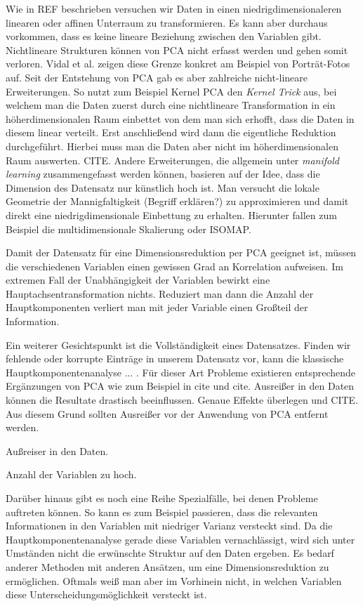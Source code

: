 Wie in REF beschrieben versuchen wir Daten in einen niedrigdimensionaleren linearen oder affinen Unterraum zu transformieren. Es kann aber durchaus vorkommen, dass es keine lineare Beziehung zwischen den Variablen gibt. Nichtlineare Strukturen können von PCA nicht erfasst werden und gehen somit verloren. \cite{vidal} Vidal et al. zeigen diese Grenze konkret am Beispiel von Porträt-Fotos auf. Seit der Entstehung von PCA gab es aber zahlreiche nicht-lineare Erweiterungen. So nutzt zum Beispiel Kernel PCA den \textit{Kernel Trick} aus, bei welchem man die Daten zuerst durch eine nichtlineare Transformation in ein höherdimensionalen Raum einbettet von dem man sich erhofft, dass die Daten in diesem linear verteilt. Erst anschließend wird dann die eigentliche Reduktion durchgeführt. Hierbei muss man die Daten aber nicht im höherdimensionalen Raum auswerten. CITE. Andere Erweiterungen, die allgemein unter \textit{manifold learning} zusammengefasst werden können, basieren auf der Idee, dass die Dimension des Datensatz nur künstlich hoch ist. Man versucht die lokale Geometrie der Mannigfaltigkeit (Begriff erklären?) zu approximieren und damit direkt eine niedrigdimensionale Einbettung zu erhalten. Hierunter fallen zum Beispiel die multidimensionale Skalierung oder ISOMAP.

Damit der Datensatz für eine Dimensionsreduktion per PCA geeignet ist, müssen die verschiedenen Variablen einen gewissen Grad an Korrelation aufweisen. Im extremen Fall der Unabhängigkeit der Variablen bewirkt eine Hauptachsentransformation nichts. Reduziert man dann die Anzahl der Hauptkomponenten verliert man mit jeder Variable einen Großteil der Information.

Ein weiterer Gesichtspunkt ist die Vollständigkeit eines Datensatzes. Finden wir fehlende oder korrupte Einträge in unserem Datensatz vor, kann die klassische Hauptkomponentenanalyse ... . Für dieser Art Probleme existieren entsprechende Ergänzungen von PCA wie zum Beispiel in cite und cite. Ausreißer in den Daten können die Resultate drastisch beeinflussen. Genaue Effekte überlegen und CITE. Aus diesem Grund sollten Ausreißer vor der Anwendung von PCA entfernt werden.

Außreiser in den Daten.

Anzahl der Variablen zu hoch.

Darüber hinaus gibt es noch eine Reihe Spezialfälle, bei denen Probleme auftreten können. So kann es zum Beispiel passieren, dass die relevanten Informationen in den Variablen mit niedriger Varianz versteckt sind. Da die Hauptkomponentenanalyse gerade diese Variablen vernachlässigt, wird sich unter Umständen nicht die erwünschte Struktur auf den Daten ergeben. Es bedarf anderer Methoden mit anderen Ansätzen, um eine Dimensionsreduktion zu ermöglichen. Oftmals weiß man aber im Vorhinein nicht, in welchen Variablen diese Unterscheidungsmöglichkeit versteckt ist.

